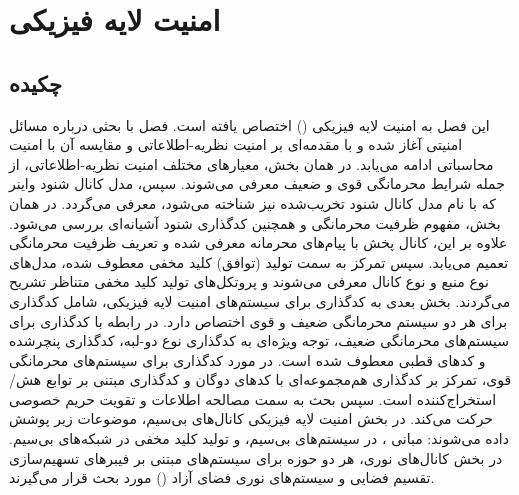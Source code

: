 \chapter{امنیت لایه فیزیکی}
\label{chap:4}

\section*{چکیده}
این فصل به امنیت لایه فیزیکی () اختصاص یافته است. فصل با بحثی درباره مسائل امنیتی آغاز شده و با مقدمه‌ای بر امنیت نظریه-اطلاعاتی و مقایسه آن با امنیت محاسباتی ادامه می‌یابد. در همان بخش، معیارهای مختلف امنیت نظریه-اطلاعاتی، از جمله شرایط محرمانگی قوی و ضعیف معرفی می‌شوند. سپس، مدل کانال شنود واینر که با نام مدل کانال شنود تخریب‌شده نیز شناخته می‌شود، معرفی می‌گردد. در همان بخش، مفهوم ظرفیت محرمانگی و همچنین کدگذاری شنود آشیانه‌ای بررسی می‌شود. علاوه بر این، کانال پخش با پیام‌های محرمانه معرفی شده و تعریف ظرفیت محرمانگی تعمیم می‌یابد. سپس تمرکز به سمت تولید (توافق) کلید مخفی معطوف شده، مدل‌های نوع منبع و نوع کانال معرفی می‌شوند و پروتکل‌های تولید کلید مخفی متناظر تشریح می‌گردند. بخش بعدی به کدگذاری برای سیستم‌های امنیت لایه فیزیکی، شامل کدگذاری برای هر دو سیستم محرمانگی ضعیف و قوی اختصاص دارد. در رابطه با کدگذاری برای سیستم‌های محرمانگی ضعیف، توجه ویژه‌ای به کدگذاری  نوع دو-لبه، کدگذاری  پنچرشده و کدهای قطبی معطوف شده است. در مورد کدگذاری برای سیستم‌های محرمانگی قوی، تمرکز بر کدگذاری هم‌مجموعه‌ای با کدهای  دوگان و کدگذاری مبتنی بر توابع هش/استخراج‌کننده است. سپس بحث به سمت مصالحه اطلاعات و تقویت حریم خصوصی حرکت می‌کند. در بخش امنیت لایه فیزیکی کانال‌های بی‌سیم، موضوعات زیر پوشش داده می‌شوند: مبانی ،  در سیستم‌های  بی‌سیم، و تولید کلید مخفی در شبکه‌های بی‌سیم. در بخش  کانال‌های نوری، هر دو حوزه  برای سیستم‌های مبتنی بر فیبرهای تسهیم‌سازی تقسیم فضایی و سیستم‌های نوری فضای آزاد () مورد بحث قرار می‌گیرند.







